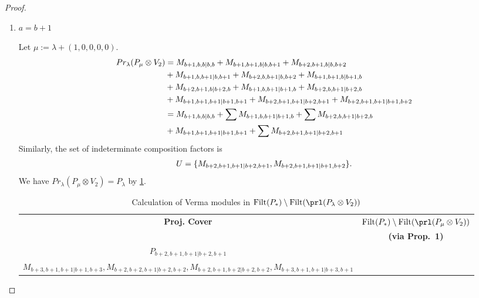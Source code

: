 \begin{proof}
\begin{enumerate}
\begin{enumerate}
      \item $a=b+1$ \par
        Let $\mu:=\lambda + (1,0,0,0,0) $. 
        \begin{equation}\notag
          \begin{aligned}
            Pr_{\lambda}(P_\mu \otimes V_{2}) &= 
M_{b+1,b,b|b,b}
+M_{b+1,b+1,b|b,b+1}
+M_{b+2,b+1,b|b,b+2}\\
                                            &
+M_{b+1,b,b+1|b,b+1}
+M_{b+2,b,b+1|b,b+2}
+M_{b+1,b+1,b|b+1,b}\\
                                            &
+M_{b+2,b+1,b|b+2,b}
+M_{b+1,b,b+1|b+1,b}
+M_{b+2,b,b+1|b+2,b}\\
                                            &
+M_{b+1,b+1,b+1|b+1,b+1}
+M_{b+2,b+1,b+1|b+2,b+1}
+M_{b+2,b+1,b+1|b+1,b+2}\\
                                               &=
 M_{b+1,b,b|b,b}
+\sum M_{b+1,b,b+1|b+1,b}
+\sum M_{b+2,b,b+1|b+2,b}\\
                                            &
+ M_{b+1,b+1,b+1|b+1,b+1}
+\sum M_{b+2,b+1,b+1|b+2,b+1}
          \end{aligned}
        \end{equation}
      Similarly, the set of indeterminate composition factors is 
\begin{equation}\notag
  \begin{aligned}
    U = \{
M_{b+2,b+1,b+1|b+2,b+1},
M_{b+2,b+1,b+1|b+1,b+2}
\}.
  \end{aligned}
\end{equation}
       We have $Pr_{\lambda}(P_\mu \otimes V_{2}) = P_\lambda  $ by \cref{tab:verma-analysis_4}. 
\begin{table}[htbp]
\centering
\caption{Calculation of Verma modules in $\operatorname{Filt}(P_*) \setminus \operatorname{Filt}(\prl(P_\lambda \otimes V_2)) $ } \label{tab:verma-analysis_4}
\begin{tabular}{cc}
\toprule
  \textbf{Proj. Cover} & \textbf{$\operatorname{Filt}(P_*) \setminus \operatorname{Filt}(\prl(P_\mu \otimes V_2)) $}  \\
     & \textbf{(via Prop.~1)}  \\
\midrule
  $P_{b+2,b+1,b+1|b+2,b+1}$ & \makecell{
$M_{b+3,b+2,b+1|b+2,b+3},
M_{b+3,b+2,b+1|b+3,b+2},
M_{b+3,b+1,b+2|b+2,b+3},
M_{b+3,b+1,b+2|b+3,b+2},$ \\
$M_{b+3,b+1,b+1|b+1,b+3},
M_{b+2,b+2,b+1|b+2,b+2},
M_{b+2,b+1,b+2|b+2,b+2},
M_{b+3,b+1,b+1|b+3,b+1}$
  } \\

\end{tabular}
\end{table}
\end{enumerate}
\end{enumerate}
\end{proof}
